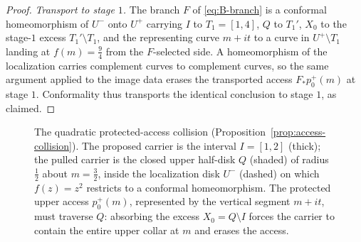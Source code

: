 \documentclass[11pt,reqno]{amsart}
\theoremstyle{definition}
\theoremstyle{remark}
\begin{document}
\begin{proof}
\emph{Transport to stage $1$.}
The branch $F$ of \eqref{eq:B-branch} is a conformal homeomorphism of
$U^{-}$ onto $U^{+}$ carrying $I$ to $T_1=[1,4]$, $Q$ to $T_1'$, $X_0$ to the
stage-$1$ excess $T_1'\setminus T_1$, and the representing curve $m+it$ to a
curve in $U^{+}\setminus T_1$ landing at $f(m)=\tfrac94$ from the
$F$-selected side. A homeomorphism of the localization carries complement
curves to complement curves, so the same argument applied to the image data
erases the transported access $F_{*}p_0^{+}(m)$ at stage $1$. Conformality
thus transports the identical conclusion to stage $1$, as claimed.
\end{proof}

\begin{figure}[ht]
\centering
{}
\caption{The quadratic protected-access collision
(Proposition~\ref{prop:access-collision}). The proposed carrier is the
interval $I=[1,2]$ (thick); the pulled carrier is the closed upper half-disk
$Q$ (shaded) of radius $\tfrac12$ about $m=\tfrac32$, inside the localization
disk $U^{-}$ (dashed) on which $f(z)=z^{2}$ restricts to a conformal
homeomorphism. The protected upper access $p_0^{+}(m)$, represented by the
vertical segment $m+it$, must traverse $Q$: absorbing the excess
$X_0=Q\setminus I$ forces the carrier to contain the entire upper collar at
$m$ and erases the access.}
\label{fig:access-collision}
\end{figure}
\end{document}
